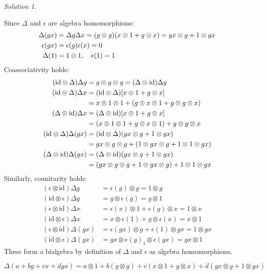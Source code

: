 \documentclass{article}
\theoremstyle{definition}
\theoremstyle{remark}
\newtheorem*{Solution*}{Solution}
\theoremstyle{underline}
\theoremstyle{underline}
\newcommand{\id}{\mathrm{id}}
\begin{document}
\begin{Solution*}
\begin{subquests}
			\item Since $\Delta$ and $\epsilon$ are algebra homomorphisms:
			\begin{align*}
			\Delta(gx) & = \Delta g \Delta x = \pqty{g \otimes g}\pqty{x \otimes 1 + g \otimes x} = gx \otimes g + 1 \otimes gx \\
			\epsilon(gx) & = \epsilon(g) \epsilon(x) = 0\\
			\Delta(1) & = 1 \otimes 1, \quad \epsilon(1) = 1
			\end{align*}
			Coassociativity holds:
			\begin{align*}
			 	(\id \otimes \Delta) \Delta g & = g \otimes g \otimes g = (\Delta \otimes \id) \Delta g \\
			 	(\id \otimes \Delta) \Delta x & = (\id \otimes \Delta) \bqty{x \otimes 1 + g \otimes x} \\
			 		& = x \otimes 1 \otimes 1 + \pqty{g \otimes x \otimes 1 + g \otimes g \otimes x} \\
			 	(\Delta \otimes \id) \Delta x & = (\Delta \otimes \id)\bqty{x \otimes 1 + g \otimes x} \\
				 	& =  \pqty{x \otimes 1 \otimes 1 + g \otimes x \otimes 1} + g \otimes g \otimes x \\
				(\id \otimes \Delta)\Delta (gx) & = (\id \otimes \Delta)\pqty{gx \otimes g + 1 \otimes gx} \\
					& = gx \otimes g \otimes g + \pqty{1 \otimes gx \otimes g + 1 \otimes 1 \otimes gx} \\
				(\Delta \otimes \id)\Delta (gx) & = (\Delta \otimes \id)\pqty{gx \otimes g + 1 \otimes gx} \\
					& = \pqty{gx \otimes g \otimes g + 1 \otimes gx \otimes g} + 1 \otimes 1 \otimes gx
			\end{align*}
			Similarly, counitarity holds:
			\begin{align*}
			(\epsilon \otimes \id) \Delta g & = \epsilon (g) \otimes g = 1 \otimes g\\
			(\id \otimes \epsilon) \Delta g & = g \otimes \epsilon(g) = g \otimes 1\\
			(\epsilon \otimes \id) \Delta x & = \epsilon(x) \otimes 1 + \epsilon(g) \otimes x = 1 \otimes x\\
			(\id \otimes \epsilon) \Delta x & = x \otimes \epsilon(1) + g \otimes \epsilon(x) = x \otimes 1\\
			(\epsilon \otimes \id) \Delta(gx) & = \epsilon(gx) \otimes g + \epsilon(1) \otimes gx = 1 \otimes gx\\
			(\id \otimes \epsilon) \Delta(gx) & = gx \otimes \epsilon(g) _ 1 \otimes \epsilon(gx) = gx \otimes 1
			\end{align*}
			These form a bialgebra by definition of $\Delta$ and $\epsilon$ as algebra homomorphisms.

			\item $\Delta(a + bg + cx + dgx) = a \otimes 1 + b(g \otimes g) + c(x \otimes 1 + g \otimes x) + d(gx \otimes g + 1 \otimes gx)$ 
		\end{subquests}
	\end{Solution*}
\end{document}
